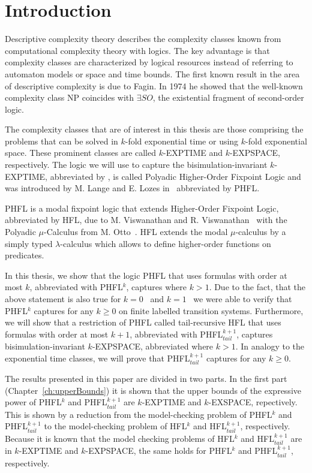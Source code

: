 \chapter{Introduction}\label{ch:introduction}

Descriptive complexity theory describes the complexity classes known from computational complexity theory with logics. The key advantage is that complexity classes are characterized by logical resources instead of referring to automaton models or space and time bounds. The first known result in the area of descriptive complexity is due to Fagin. In 1974 he showed that the well-known complexity class NP coincides with $\exists SO$, the existential fragment of second-order logic. 

The complexity classes that are of interest in this thesis are those comprising the problems that can be solved in $k$-fold exponential time or using $k$-fold exponential space. These prominent classes are called $k$-EXPTIME and $k$-EXPSPACE, respectively. The logic we will use to capture the bisimulation-invariant $k$-EXPTIME, abbreviated by , is called Polyadic Higher-Order Fixpoint Logic and was introduced by M. Lange and E. Lozes in~\cite{lange2014capturing} abbreviated by PHFL. 

PHFL is a modal fixpoint logic that extends Higher-Order Fixpoint Logic, abbreviated by HFL, due to M. Viswanathan and R. Viswanathan~\cite{viswanathan2004higher} with the Polyadic $\mu$-Calculus from M. Otto~\cite{otto1999bisimulation}. HFL extends the modal $\mu$-calculus by a simply typed $\lambda$-calculus which allows to define higher-order functions on predicates.

In this thesis, we show that the logic PHFL that uses formulas with order at most $k$, abbreviated with PHFL$^k$, captures  where $k > 1$. Due to the fact, that the above statement is also true for $k = 0$~\cite{otto1999bisimulation} and $k = 1$~\cite{lange2014capturing} we were able to verify that PHFL$^k$ captures  for any $k \geq 0$ on finite labelled transition systems. Furthermore, we will show that a restriction of PHFL called tail-recursive HFL that uses formulas with order at most $k+1$, abbreviated with PHFL$^{k+1}_{tail}$, captures bisimulation-invariant $k$-EXPSPACE, abbreviated  where $k > 1$. In analogy to the exponential time classes, we will prove that PHFL$^{k+1}_{tail}$ captures  for any $k \geq 0$. 

The results presented in this paper are divided in two parts. In the first part (Chapter~\ref{ch:upperBounds}) it is shown that the upper bounds of the expressive power of PHFL$^k$ and PHFL$^{k+1}_{tail}$ are $k$-EXPTIME and $k$-EXSPACE, repectively. This is shown by a reduction from the model-checking problem of PHFL$^k$ and PHFL$^{k+1}_{tail}$ to the model-checking problem of HFL$^k$ and HFL$^{k+1}_{tail}$, respectively. Because it is known that the model checking problems of HFL$^k$ and HFL$^{k+1}_{tail}$ are in $k$-EXPTIME and $k$-EXPSPACE, the same holds for PHFL$^k$ and PHFL$^{k+1}_{tail}$, respectively.

